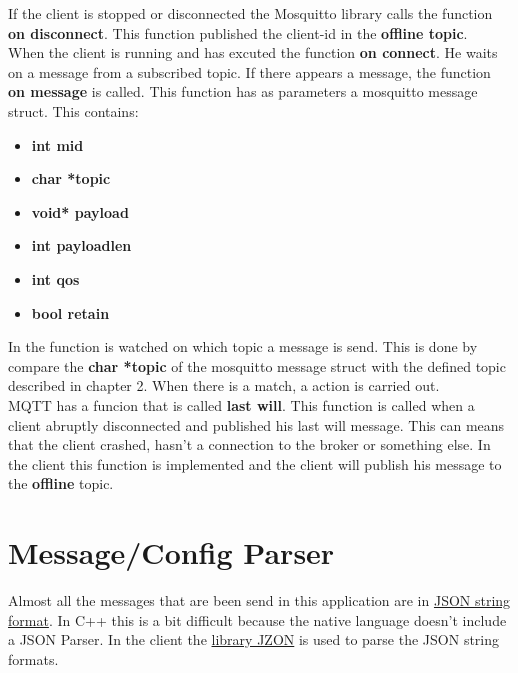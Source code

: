 If the client is stopped or disconnected the Mosquitto library calls the function \textbf {on disconnect}. This function published the client-id in the \textbf {offline topic}.\\

When the client is running and has excuted the function \textbf {on connect}. He waits on a message from a subscribed topic. If there appears a message, the function \textbf {on message} is called. This function has as parameters a mosquitto message struct. This contains:
\small{
\begin{itemize} [noitemsep, nolistsep]
	\item \textbf {int mid}
	\item \textbf {char *topic}
	\item \textbf {void* payload}
	\item \textbf {int payloadlen}
	\item \textbf {int qos}
	\item \textbf {bool retain\\}
\end{itemize}
}

In the function is watched on which topic a message is send. This is done by compare the \textbf {char *topic} of the mosquitto message struct with the defined topic described in chapter 2. When there is a match, a action is carried out.\\

MQTT has a funcion that is called \textbf {last will}. This function is called when a client abruptly disconnected and published his last will message. This can means that the client crashed, hasn't a connection to the broker or something else. In the client this function is implemented and the client will publish his message to the \textbf {offline} topic.

\section{Message/Config Parser}

Almost all the messages that are been send in this application are in \href{http://www.json.org/}{JSON string format}. In C++ this is a bit difficult because the native language doesn't include a JSON Parser. In the client the \href{https://github.com/Zguy/Jzon}{library JZON} is used to parse the JSON string formats.\\

